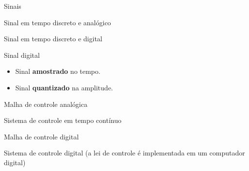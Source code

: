 \begin{frame}{Sinais}
\begin{minipage}{0.48\linewidth}
	\centering
	
	\scalebox{0.5}{}
	
	Sinal em tempo discreto e analógico
\end{minipage}
\hfill
\begin{minipage}{0.48\linewidth}
	\centering
	
	\scalebox{0.51}{}
	
	Sinal em tempo discreto e digital
\end{minipage}


\bigskip

\begin{block}{Sinal digital}
\begin{itemize}
	\item Sinal \textbf{amostrado} no tempo.
	\item Sinal \textbf{quantizado} na amplitude.
\end{itemize}
\end{block}

\end{frame}


\begin{frame}{Malha de controle analógica}
	
	\centering
	
	\scalebox{0.8}{}
	
	Sistema de controle em tempo contínuo
	
\end{frame}


\begin{frame}{Malha de controle digital}
	
	\centering
	
	\scalebox{0.65}{}
	
	Sistema de controle digital (a lei de controle é implementada em um computador digital)
	
\end{frame}


